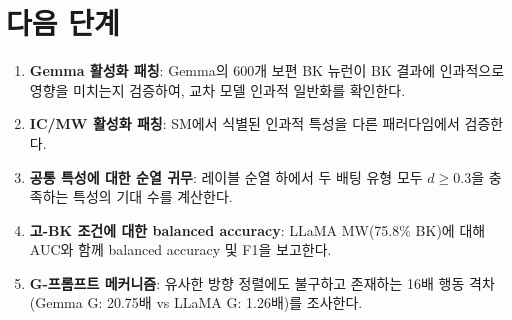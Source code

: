 \documentclass[11pt,a4paper]{article}
\begin{document}
\section{다음 단계}

\begin{enumerate}[leftmargin=2em]
    \item \textbf{Gemma 활성화 패칭}: Gemma의 600개 보편 BK 뉴런이 BK 결과에 인과적으로 영향을 미치는지 검증하여, 교차 모델 인과적 일반화를 확인한다.
    \item \textbf{IC/MW 활성화 패칭}: SM에서 식별된 인과적 특성을 다른 패러다임에서 검증한다.
    \item \textbf{공통 특성에 대한 순열 귀무}: 레이블 순열 하에서 두 배팅 유형 모두 $d$$\geq$0.3을 충족하는 특성의 기대 수를 계산한다.
    \item \textbf{고-BK 조건에 대한 balanced accuracy}: LLaMA MW(75.8\% BK)에 대해 AUC와 함께 balanced accuracy 및 F1을 보고한다.
    \item \textbf{G-프롬프트 메커니즘}: 유사한 방향 정렬에도 불구하고 존재하는 16배 행동 격차(Gemma G: 20.75배 vs LLaMA G: 1.26배)를 조사한다.
\end{enumerate}
\end{document}
